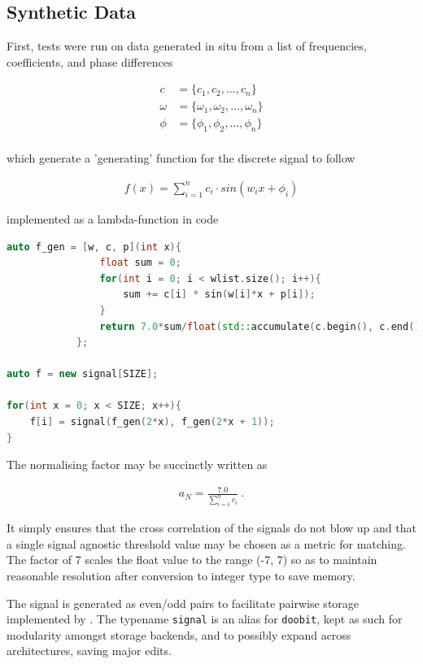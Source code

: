 \subsection{Synthetic Data}

First, tests were run on data generated in situ from a list of frequencies,
coefficients, and phase differences

\begin{align*}
    c &= \{c_1, c_2, \ldots, c_n\}\\
    \omega &= \{\omega_1, \omega_2, \ldots, \omega_n\}\\
    \phi &= \{\phi_1, \phi_2, \ldots, \phi_n\}\\
\end{align*}

which generate a 'generating' function for the discrete signal to follow

\begin{align*}
    f(x) = \sum_{i = 1}^{n} c_i \cdot sin(w_i x + \phi_i)
\end{align*}

implemented as a lambda-function in code 

\begin{lstlisting}[language=C++]
auto f_gen = [w, c, p](int x){
                float sum = 0;
                for(int i = 0; i < wlist.size(); i++){
                    sum += c[i] * sin(w[i]*x + p[i]);
                }
                return 7.0*sum/float(std::accumulate(c.begin(), c.end(), 0));
            };
            
auto f = new signal[SIZE];

for(int x = 0; x < SIZE; x++){
    f[i] = signal(f_gen(2*x), f_gen(2*x + 1));
}
\end{lstlisting}

The normalising factor may be succinctly written as 

\begin{align*}
    a_N = \frac{7.0}{\sum_{i = 1}^{n}c_i}~.
\end{align*}

It simply ensures that the cross correlation of the signals do not blow up and
that a single signal agnostic threshold value may be chosen as a metric for
matching. The factor of 7 scales the float value to the range (-7, 7) so as to
maintain reasonable resolution after conversion to integer type to save memory.

The signal is generated as even/odd pairs to facilitate pairwise storage
implemented by . The typename \texttt{signal} is an alias
for \texttt{doobit}, kept as such for modularity amongst storage backends, and
to possibly expand across architectures, saving major edits.

